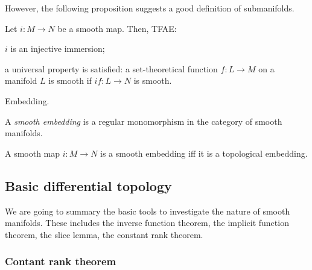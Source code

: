 \documentclass{../exp}
\begin{document}
However, the following proposition suggests a good definition of submanifolds.
\begin{prop}
Let $i:M\to N$ be a smooth map.
Then, TFAE:
\begin{cond}
\item $i$ is an injective immersion;
\item a universal property is satisfied: a set-theoretical function $f:L\to M$ on a manifold $L$ is smooth if $if:L\to N$ is smooth.
\end{cond}
\end{prop}


Embedding.

\begin{defn}
A \emph{smooth embedding} is a regular monomorphism in the category of smooth manifolds.
\end{defn}
\begin{prop}
A smooth map $i:M\to N$ is a smooth embedding iff it is a topological embedding.
\end{prop}










\subsection{Basic differential topology}
We are going to summary the basic tools to investigate the nature of smooth manifolds.
These includes the inverse function theorem, the implicit function theorem, the slice lemma, the constant rank theorem.


\subsubsection{Contant rank theorem}
\end{document}
